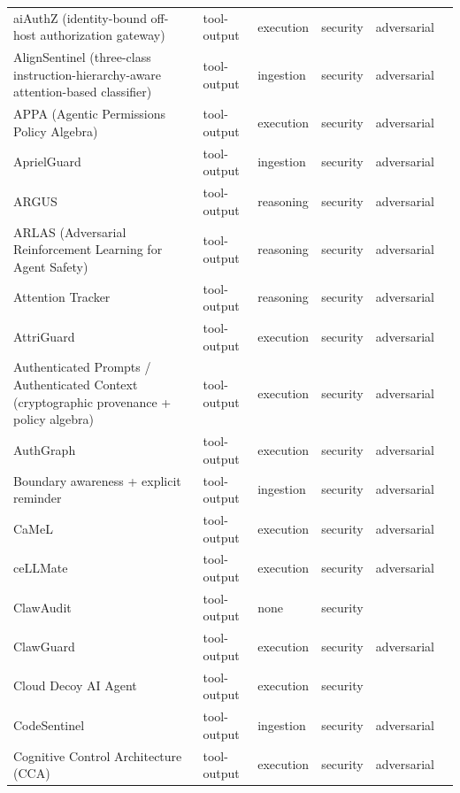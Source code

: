 \begin{longtable}{@{}p{}lllll@{}}
aiAuthZ (identity-bound off-host authorization gateway) & tool-output & execution & security & adversarial & \cite{kodathala-2026-aiauthz} \\
AlignSentinel (three-class instruction-hierarchy-aware attention-based classifier) & tool-output & ingestion & security & adversarial & \cite{jia-2026-alignsentinel} \\
APPA (Agentic Permissions Policy Algebra) & tool-output & execution & security & adversarial & \cite{kravchenko-2026-agentic} \\
AprielGuard & tool-output & ingestion & security & adversarial & \cite{kasundra-2025-aprielguard} \\
ARGUS & tool-output & reasoning & security & adversarial & \cite{weng-2026-argus} \\
ARLAS (Adversarial Reinforcement Learning for Agent Safety) & tool-output & reasoning & security & adversarial & \cite{wang-2025-adversarial} \\
Attention Tracker & tool-output & reasoning & security & adversarial & \cite{hung-2024-attention} \\
AttriGuard & tool-output & execution & security & adversarial & \cite{he-2026-attriguard} \\
Authenticated Prompts / Authenticated Context (cryptographic provenance + policy algebra) & tool-output & execution & security & adversarial & \cite{rajagopalan-2026-protecting} \\
AuthGraph & tool-output & execution & security & adversarial & \cite{wang-2026-aligning} \\
Boundary awareness + explicit reminder & tool-output & ingestion & security & adversarial & \cite{yi-2023-benchmarking} \\
CaMeL & tool-output & execution & security & adversarial & \cite{debenedetti-2025-defeating} \\
ceLLMate & tool-output & execution & security & adversarial & \cite{meng-2025-cellmate} \\
ClawAudit & tool-output & none & security &  & \cite{zhang-2026-local} \\
ClawGuard & tool-output & execution & security & adversarial & \cite{zhao-2026-clawguard} \\
Cloud Decoy AI Agent & tool-output & execution & security &  & \cite{manivannan-2026-agentic} \\
CodeSentinel & tool-output & ingestion & security & adversarial & \cite{cheng-2026-codesentinel} \\
Cognitive Control Architecture (CCA) & tool-output & execution & security & adversarial & \cite{liang-2025-cognitive} \\

\end{longtable}
